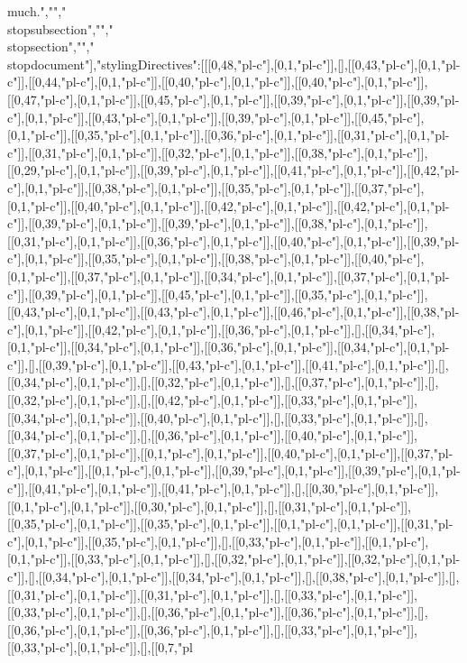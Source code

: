 much.","","\\stopsubsection","","\\stopsection","","\\stopdocument"],"stylingDirectives":[[[0,48,"pl-c"],[0,1,"pl-c"]],[],[[0,43,"pl-c"],[0,1,"pl-c"]],[[0,44,"pl-c"],[0,1,"pl-c"]],[[0,40,"pl-c"],[0,1,"pl-c"]],[[0,40,"pl-c"],[0,1,"pl-c"]],[[0,47,"pl-c"],[0,1,"pl-c"]],[[0,45,"pl-c"],[0,1,"pl-c"]],[[0,39,"pl-c"],[0,1,"pl-c"]],[[0,39,"pl-c"],[0,1,"pl-c"]],[[0,43,"pl-c"],[0,1,"pl-c"]],[[0,39,"pl-c"],[0,1,"pl-c"]],[[0,45,"pl-c"],[0,1,"pl-c"]],[[0,35,"pl-c"],[0,1,"pl-c"]],[[0,36,"pl-c"],[0,1,"pl-c"]],[[0,31,"pl-c"],[0,1,"pl-c"]],[[0,31,"pl-c"],[0,1,"pl-c"]],[[0,32,"pl-c"],[0,1,"pl-c"]],[[0,38,"pl-c"],[0,1,"pl-c"]],[[0,29,"pl-c"],[0,1,"pl-c"]],[[0,39,"pl-c"],[0,1,"pl-c"]],[[0,41,"pl-c"],[0,1,"pl-c"]],[[0,42,"pl-c"],[0,1,"pl-c"]],[[0,38,"pl-c"],[0,1,"pl-c"]],[[0,35,"pl-c"],[0,1,"pl-c"]],[[0,37,"pl-c"],[0,1,"pl-c"]],[[0,40,"pl-c"],[0,1,"pl-c"]],[[0,42,"pl-c"],[0,1,"pl-c"]],[[0,42,"pl-c"],[0,1,"pl-c"]],[[0,39,"pl-c"],[0,1,"pl-c"]],[[0,39,"pl-c"],[0,1,"pl-c"]],[[0,38,"pl-c"],[0,1,"pl-c"]],[[0,31,"pl-c"],[0,1,"pl-c"]],[[0,36,"pl-c"],[0,1,"pl-c"]],[[0,40,"pl-c"],[0,1,"pl-c"]],[[0,39,"pl-c"],[0,1,"pl-c"]],[[0,35,"pl-c"],[0,1,"pl-c"]],[[0,38,"pl-c"],[0,1,"pl-c"]],[[0,40,"pl-c"],[0,1,"pl-c"]],[[0,37,"pl-c"],[0,1,"pl-c"]],[[0,34,"pl-c"],[0,1,"pl-c"]],[[0,37,"pl-c"],[0,1,"pl-c"]],[[0,39,"pl-c"],[0,1,"pl-c"]],[[0,45,"pl-c"],[0,1,"pl-c"]],[[0,35,"pl-c"],[0,1,"pl-c"]],[[0,43,"pl-c"],[0,1,"pl-c"]],[[0,43,"pl-c"],[0,1,"pl-c"]],[[0,46,"pl-c"],[0,1,"pl-c"]],[[0,38,"pl-c"],[0,1,"pl-c"]],[[0,42,"pl-c"],[0,1,"pl-c"]],[[0,36,"pl-c"],[0,1,"pl-c"]],[],[[0,34,"pl-c"],[0,1,"pl-c"]],[[0,34,"pl-c"],[0,1,"pl-c"]],[[0,36,"pl-c"],[0,1,"pl-c"]],[[0,34,"pl-c"],[0,1,"pl-c"]],[],[[0,39,"pl-c"],[0,1,"pl-c"]],[[0,43,"pl-c"],[0,1,"pl-c"]],[[0,41,"pl-c"],[0,1,"pl-c"]],[],[[0,34,"pl-c"],[0,1,"pl-c"]],[],[[0,32,"pl-c"],[0,1,"pl-c"]],[],[[0,37,"pl-c"],[0,1,"pl-c"]],[],[[0,32,"pl-c"],[0,1,"pl-c"]],[],[[0,42,"pl-c"],[0,1,"pl-c"]],[[0,33,"pl-c"],[0,1,"pl-c"]],[[0,34,"pl-c"],[0,1,"pl-c"]],[[0,40,"pl-c"],[0,1,"pl-c"]],[],[[0,33,"pl-c"],[0,1,"pl-c"]],[],[[0,34,"pl-c"],[0,1,"pl-c"]],[],[[0,36,"pl-c"],[0,1,"pl-c"]],[[0,40,"pl-c"],[0,1,"pl-c"]],[[0,37,"pl-c"],[0,1,"pl-c"]],[[0,1,"pl-c"],[0,1,"pl-c"]],[[0,40,"pl-c"],[0,1,"pl-c"]],[[0,37,"pl-c"],[0,1,"pl-c"]],[[0,1,"pl-c"],[0,1,"pl-c"]],[[0,39,"pl-c"],[0,1,"pl-c"]],[[0,39,"pl-c"],[0,1,"pl-c"]],[[0,41,"pl-c"],[0,1,"pl-c"]],[[0,41,"pl-c"],[0,1,"pl-c"]],[],[[0,30,"pl-c"],[0,1,"pl-c"]],[[0,1,"pl-c"],[0,1,"pl-c"]],[[0,30,"pl-c"],[0,1,"pl-c"]],[],[[0,31,"pl-c"],[0,1,"pl-c"]],[[0,35,"pl-c"],[0,1,"pl-c"]],[[0,35,"pl-c"],[0,1,"pl-c"]],[[0,1,"pl-c"],[0,1,"pl-c"]],[[0,31,"pl-c"],[0,1,"pl-c"]],[[0,35,"pl-c"],[0,1,"pl-c"]],[],[[0,33,"pl-c"],[0,1,"pl-c"]],[[0,1,"pl-c"],[0,1,"pl-c"]],[[0,33,"pl-c"],[0,1,"pl-c"]],[],[[0,32,"pl-c"],[0,1,"pl-c"]],[[0,32,"pl-c"],[0,1,"pl-c"]],[],[[0,34,"pl-c"],[0,1,"pl-c"]],[[0,34,"pl-c"],[0,1,"pl-c"]],[],[[0,38,"pl-c"],[0,1,"pl-c"]],[],[[0,31,"pl-c"],[0,1,"pl-c"]],[[0,31,"pl-c"],[0,1,"pl-c"]],[],[[0,33,"pl-c"],[0,1,"pl-c"]],[[0,33,"pl-c"],[0,1,"pl-c"]],[],[[0,36,"pl-c"],[0,1,"pl-c"]],[[0,36,"pl-c"],[0,1,"pl-c"]],[],[[0,36,"pl-c"],[0,1,"pl-c"]],[[0,36,"pl-c"],[0,1,"pl-c"]],[],[[0,33,"pl-c"],[0,1,"pl-c"]],[[0,33,"pl-c"],[0,1,"pl-c"]],[],[[0,7,"pl